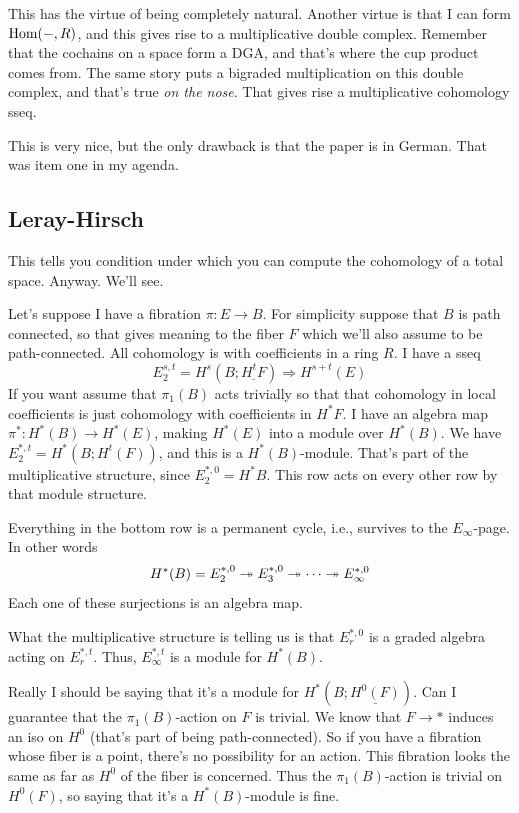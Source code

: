 This has the virtue of being completely natural.
Another virtue is that I can form $\operatorname{Hom}(-,R)$, and this gives rise to a multiplicative double complex.
Remember that the cochains on a space form a DGA, and that's where the cup product comes from.
The same story puts a bigraded multiplication on this double complex, and that's true \emph{on the nose}.
That gives rise a multiplicative cohomology sseq.

This is very nice, but the only drawback is that the paper is in German.
That was item one in my agenda.
\subsection{Leray-Hirsch}
This tells you condition under which you can compute the cohomology of a total space.
Anyway.
We'll see.

Let's suppose I have a fibration $\pi:E\to B$.
For simplicity suppose that $B$ is path connected, so that gives meaning to the fiber $F$ which we'll also assume to be path-connected.
All cohomology is with coefficients in a ring $R$.
I have a sseq
$$
E_2^{s,t} = H^s(B;\underline{H^t F}) \Rightarrow H^{s+t}(E)
$$
If you want assume that $\pi_1(B)$ acts trivially so that that cohomology in local coefficients is just cohomology with coefficients in $H^\ast F$.
I have an algebra map $\pi^\ast:H^\ast(B)\to H^\ast(E)$, making $H^\ast(E)$ into a module over $H^\ast(B)$.
We have $E^{\ast,t}_2 = H^\ast(B;H^t(F))$, and this is a $H^\ast(B)$-module.
That's part of the multiplicative structure, since $E_2^{\ast,0} = H^\ast B$.
This row acts on every other row by that module structure.

Everything in the bottom row is a permanent cycle, i.e., survives to the $E_\infty$-page.
In other words
$$
H^\ast(B) = E^{\ast,0}_2 \twoheadrightarrow E^{\ast,0}_3 \twoheadrightarrow \cdots \twoheadrightarrow E^{\ast,0}_\infty
$$
Each one of these surjections is an algebra map.

What the multiplicative structure is telling us is that $E^{\ast,0}_r$ is a graded algebra acting on $E^{\ast,t}_r$.
Thus, $E^{\ast,t}_\infty$ is a module for $H^\ast(B)$.

Really I should be saying that it's a module for $H^\ast(B;\underline{H^0(F)})$.
Can I guarantee that the $\pi_1(B)$-action on $F$ is trivial.
We know that $F\to \ast$ induces an iso on $H^0$ (that's part of being path-connected).
So if you have a fibration whose fiber is a point, there's no possibility for an action.
This fibration looks the same as far as $H^0$ of the fiber is concerned.
Thus the $\pi_1(B)$-action is trivial on $H^0(F)$, so saying that it's a $H^\ast(B)$-module is fine.

